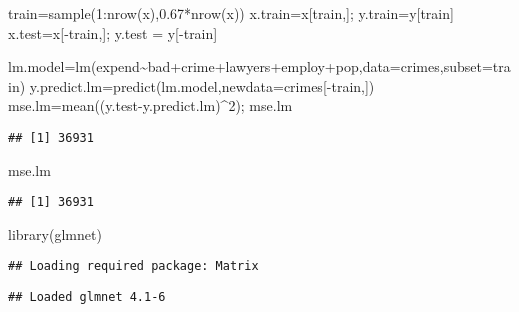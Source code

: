\documentclass[
  11pt,
]{article}
\newenvironment{Shaded}{\begin{snugshade}}{\end{snugshade}}
\newcommand{\AttributeTok}[1]{\textcolor[rgb]{0.77,0.63,0.00}{#1}}
\newcommand{\DecValTok}[1]{\textcolor[rgb]{0.00,0.00,0.81}{#1}}
\newcommand{\FloatTok}[1]{\textcolor[rgb]{0.00,0.00,0.81}{#1}}
\newcommand{\FunctionTok}[1]{\textcolor[rgb]{0.00,0.00,0.00}{#1}}
\newcommand{\NormalTok}[1]{#1}
\newcommand{\OtherTok}[1]{\textcolor[rgb]{0.56,0.35,0.01}{#1}}
\newcommand{\SpecialCharTok}[1]{\textcolor[rgb]{0.00,0.00,0.00}{#1}}
\begin{document}
\begin{Shaded}
\begin{Highlighting}[]
\NormalTok{train}\OtherTok{=}\FunctionTok{sample}\NormalTok{(}\DecValTok{1}\SpecialCharTok{:}\FunctionTok{nrow}\NormalTok{(x),}\FloatTok{0.67}\SpecialCharTok{*}\FunctionTok{nrow}\NormalTok{(x))}
\NormalTok{x.train}\OtherTok{=}\NormalTok{x[train,]; y.train}\OtherTok{=}\NormalTok{y[train]}
\NormalTok{x.test}\OtherTok{=}\NormalTok{x[}\SpecialCharTok{{-}}\NormalTok{train,]; y.test }\OtherTok{=}\NormalTok{ y[}\SpecialCharTok{{-}}\NormalTok{train] }

\NormalTok{lm.model}\OtherTok{=}\FunctionTok{lm}\NormalTok{(expend}\SpecialCharTok{\textasciitilde{}}\NormalTok{bad}\SpecialCharTok{+}\NormalTok{crime}\SpecialCharTok{+}\NormalTok{lawyers}\SpecialCharTok{+}\NormalTok{employ}\SpecialCharTok{+}\NormalTok{pop,}\AttributeTok{data=}\NormalTok{crimes,}\AttributeTok{subset=}\NormalTok{train)}
\NormalTok{y.predict.lm}\OtherTok{=}\FunctionTok{predict}\NormalTok{(lm.model,}\AttributeTok{newdata=}\NormalTok{crimes[}\SpecialCharTok{{-}}\NormalTok{train,])}
\NormalTok{mse.lm}\OtherTok{=}\FunctionTok{mean}\NormalTok{((y.test}\SpecialCharTok{{-}}\NormalTok{y.predict.lm)}\SpecialCharTok{\^{}}\DecValTok{2}\NormalTok{); mse.lm}
\end{Highlighting}
\end{Shaded}

\begin{verbatim}
## [1] 36931
\end{verbatim}

\begin{Shaded}
\begin{Highlighting}[]
\NormalTok{mse.lm}
\end{Highlighting}
\end{Shaded}

\begin{verbatim}
## [1] 36931
\end{verbatim}

\begin{Shaded}
\begin{Highlighting}[]
\FunctionTok{library}\NormalTok{(glmnet) }
\end{Highlighting}
\end{Shaded}

\begin{verbatim}
## Loading required package: Matrix
\end{verbatim}

\begin{verbatim}
## Loaded glmnet 4.1-6
\end{verbatim}
\end{document}
